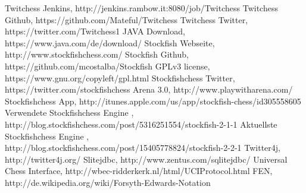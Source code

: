 \begin{thebibliography}{solangkanns}
 Twitchess Jenkins,
http://jenkins.rambow.it:8080/job/Twitchess 
 Twitchess Github,
https://github.com/Mateful/Twitchess 
 Twitchess Twitter,
https://twitter.com/Twitchess1 
 JAVA Download, https://www.java.com/de/download/
 Stockfish Webseite, http://www.stockfishchess.com/
 Stockfish Github, https://github.com/mcostalba/Stockfish
 GPLv3 license, https://www.gnu.org/copyleft/gpl.html
 Stockfishchess Twitter, https://twitter.com/stockfishchess
 Arena 3.0, http://www.playwitharena.com/
 Stockfishchess App, 
http://itunes.apple.com/us/app/stockfish-chess/id305558605
 Verwendete Stockfishchess Engine
, http://blog.stockfishchess.com/post/5316251554/stockfish-2-1-1
 Aktuellste Stockfishchess Engine
, http://blog.stockfishchess.com/post/15405778824/stockfish-2-2-1
 Twitter4j, http://twitter4j.org/
 Slitejdbc, http://www.zentus.com/sqlitejdbc/
 Universal Chess Interface,
http://wbec-ridderkerk.nl/html/UCIProtocol.html
 FEN,
http://de.wikipedia.org/wiki/Forsyth-Edwards-Notation
\end{thebibliography}